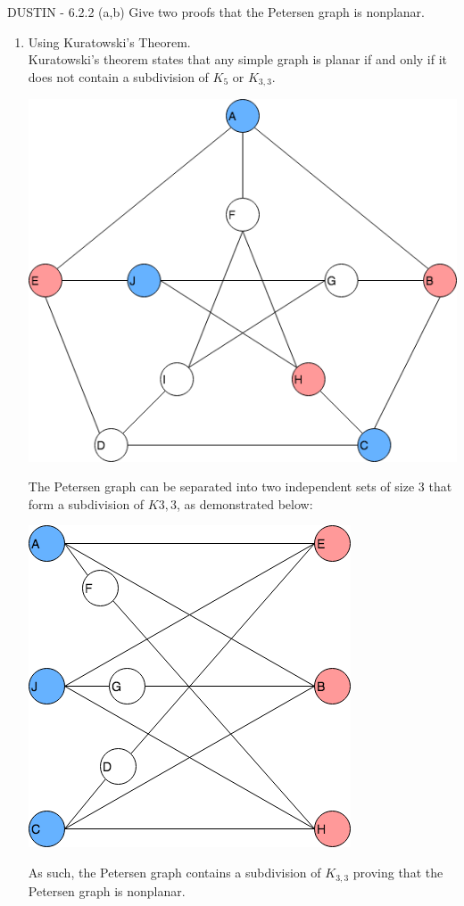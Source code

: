 \documentclass[12pt]{article}
\newenvironment{question}[2][Question]{\begin{trivlist}
\item[\hskip \labelsep {\bfseries #1}\hskip \labelsep {\bfseries #2.}]}{\end{trivlist}}
\begin{document}
\begin{question}{5}  - \color{blue}DUSTIN\color{black} - 
6.2.2 (a,b) Give two proofs that the Petersen graph is nonplanar.
\begin{enumerate}[label=\alph*)]
  \item Using Kuratowski's Theorem.   \\
  Kuratowski's theorem states that any simple graph is planar if and only if it does not contain a subdivision of $K_5$ or $K_{3,3}$.
  \begin{center}
    \includegraphics[scale=.45]{petersen}
  \end{center}
  The Petersen graph can be separated into two independent sets of size 3 that form a subdivision of $K{3,3}$, as demonstrated below:
  \begin{center}
    \includegraphics[scale=.45]{k33}
  \end{center}
  As such, the Petersen graph contains a subdivision of $K_{3,3}$ proving that the Petersen graph is nonplanar.


\end{enumerate}
\end{question}
\end{document}
